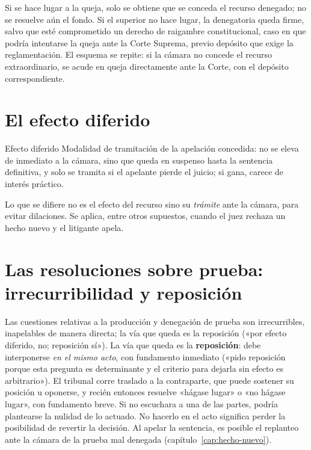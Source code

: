 \documentclass[12pt,oneside]{book}
\begin{document}
\begin{importante}
Si se hace lugar a la queja, solo se obtiene que se conceda el recurso denegado; no se resuelve aún el fondo. Si el superior no hace lugar, la denegatoria queda firme, salvo que esté comprometido un derecho de raigambre constitucional, caso en que podría intentarse la queja ante la Corte Suprema, previo depósito que exige la reglamentación. El esquema se repite: si la cámara no concede el recurso extraordinario, se acude en queja directamente ante la Corte, con el depósito correspondiente.
\end{importante}

\section{El efecto diferido}

\begin{definicion}{Efecto diferido}
Modalidad de tramitación de la apelación concedida: no se eleva de inmediato a la cámara, sino que queda en suspenso hasta la sentencia definitiva, y solo se tramita si el apelante pierde el juicio; si gana, carece de interés práctico.
\end{definicion}

\begin{nota}
Lo que se difiere no es el efecto del recurso sino su \emph{trámite} ante la cámara, para evitar dilaciones. Se aplica, entre otros supuestos, cuando el juez rechaza un hecho nuevo y el litigante apela.
\end{nota}

\section{Las resoluciones sobre prueba: irrecurribilidad y reposición}\label{sec:reposicion}

Las cuestiones relativas a la producción y denegación de prueba son irrecurribles, inapelables de manera directa; la vía que queda es la reposición («por efecto diferido, no; reposición sí»). La vía que queda es la \textbf{reposición}: debe interponerse \emph{en el mismo acto}, con fundamento inmediato («pido reposición porque esta pregunta es determinante y el criterio para dejarla sin efecto es arbitrario»). El tribunal corre traslado a la contraparte, que puede sostener su posición u oponerse, y recién entonces resuelve «hágase lugar» o «no hágase lugar», con fundamento breve. Si no escuchara a una de las partes, podría plantearse la nulidad de lo actuado. No hacerlo en el acto significa perder la posibilidad de revertir la decisión. Al apelar la sentencia, es posible el replanteo ante la cámara de la prueba mal denegada (capítulo~\ref{cap:hecho-nuevo}).
\end{document}
